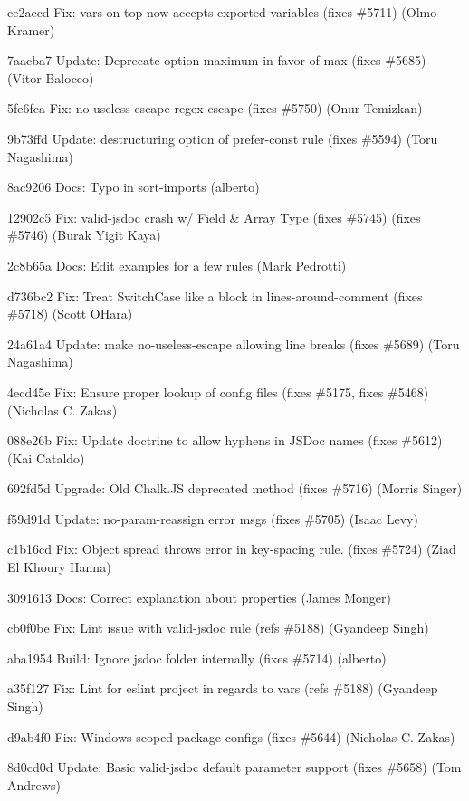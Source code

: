 \begin{DoxyItemize}
\item ce2accd Fix\+: vars-\/on-\/top now accepts exported variables (fixes \#5711) (Olmo Kramer)
\item 7aacba7 Update\+: Deprecate option {\ttfamily maximum} in favor of {\ttfamily max} (fixes \#5685) (Vitor Balocco)
\item 5fe6fca Fix\+: no-\/useless-\/escape  regex escape (fixes \#5750) (Onur Temizkan)
\item 9b73ffd Update\+: {\ttfamily destructuring} option of {\ttfamily prefer-\/const} rule (fixes \#5594) (Toru Nagashima)
\item 8ac9206 Docs\+: Typo in {\ttfamily sort-\/imports} (alberto)
\item 12902c5 Fix\+: valid-\/jsdoc crash w/ Field \& Array Type (fixes \#5745) (fixes \#5746) (Burak Yigit Kaya)
\item 2c8b65a Docs\+: Edit examples for a few rules (Mark Pedrotti)
\item d736bc2 Fix\+: Treat Switch\+Case like a block in lines-\/around-\/comment (fixes \#5718) (Scott O\textquotesingle{}Hara)
\item 24a61a4 Update\+: make {\ttfamily no-\/useless-\/escape} allowing line breaks (fixes \#5689) (Toru Nagashima)
\item 4ecd45e Fix\+: Ensure proper lookup of config files (fixes \#5175, fixes \#5468) (Nicholas C. Zakas)
\item 088e26b Fix\+: Update doctrine to allow hyphens in J\+S\+Doc names (fixes \#5612) (Kai Cataldo)
\item 692fd5d Upgrade\+: Old Chalk.\+JS deprecated method (fixes \#5716) (Morris Singer)
\item f59d91d Update\+: no-\/param-\/reassign error msgs (fixes \#5705) (Isaac Levy)
\item c1b16cd Fix\+: Object spread throws error in key-\/spacing rule. (fixes \#5724) (Ziad El Khoury Hanna)
\item 3091613 Docs\+: Correct explanation about properties (James Monger)
\item cb0f0be Fix\+: Lint issue with {\ttfamily valid-\/jsdoc} rule (refs \#5188) (Gyandeep Singh)
\item aba1954 Build\+: Ignore jsdoc folder internally (fixes \#5714) (alberto)
\item a35f127 Fix\+: Lint for eslint project in regards to vars (refs \#5188) (Gyandeep Singh)
\item d9ab4f0 Fix\+: Windows scoped package configs (fixes \#5644) (Nicholas C. Zakas)
\item 8d0cd0d Update\+: Basic valid-\/jsdoc default parameter support (fixes \#5658) (Tom Andrews)
\end{DoxyItemize}

